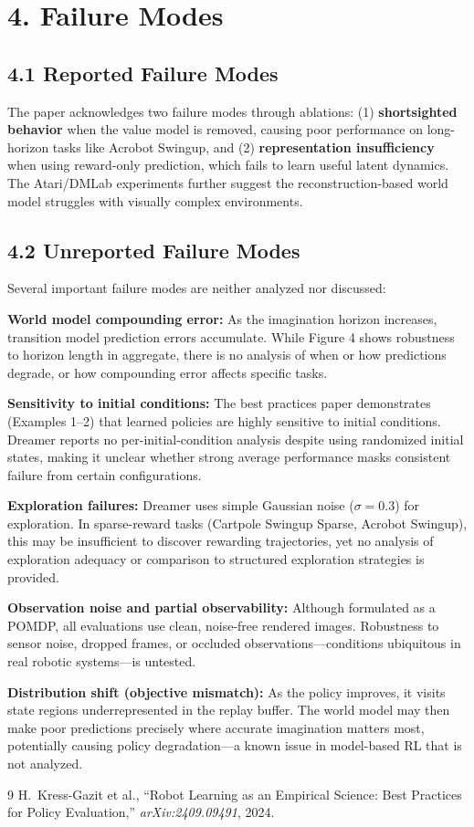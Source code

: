 \documentclass[11pt]{article}
\begin{document}
\section{4. Failure Modes}

\subsection{4.1 Reported Failure Modes}
The paper acknowledges two failure modes through ablations: (1)
\textbf{shortsighted behavior} when the value model is removed,
causing poor performance on long-horizon tasks like Acrobot Swingup,
and (2) \textbf{representation insufficiency} when using reward-only
prediction, which fails to learn useful latent dynamics. The
Atari/DMLab experiments further suggest the reconstruction-based
world model struggles with visually complex environments.

\subsection{4.2 Unreported Failure Modes}
Several important failure modes are neither analyzed nor discussed:

\textbf{World model compounding error:} As the imagination horizon
increases, transition model prediction errors accumulate. While
Figure 4 shows robustness to horizon length in aggregate, there is no
analysis of when or how predictions degrade, or how compounding error
affects specific tasks.

\textbf{Sensitivity to initial conditions:} The best practices paper
demonstrates (Examples 1--2) that learned policies are highly
sensitive to initial conditions. Dreamer reports no
per-initial-condition analysis despite using randomized initial
states, making it unclear whether strong average performance masks
consistent failure from certain configurations.

\textbf{Exploration failures:} Dreamer uses simple Gaussian noise
($\sigma = 0.3$) for exploration. In sparse-reward tasks (Cartpole
Swingup Sparse, Acrobot Swingup), this may be insufficient to
discover rewarding trajectories, yet no analysis of exploration
adequacy or comparison to structured exploration strategies is
provided.

\textbf{Observation noise and partial observability:} Although
formulated as a POMDP, all evaluations use clean, noise-free rendered
images. Robustness to sensor noise, dropped frames, or occluded
observations---conditions ubiquitous in real robotic
systems---is untested.

\textbf{Distribution shift (objective mismatch):} As the policy
improves, it visits state regions underrepresented in the replay
buffer. The world model may then make poor predictions precisely
where accurate imagination matters most, potentially causing policy
degradation---a known issue in model-based RL that is not analyzed.

\vspace{2pt}
\begin{thebibliography}{9}
  \small
   H.\ Kress-Gazit et al., ``Robot Learning as
  an Empirical Science: Best Practices for Policy Evaluation,''
  \textit{arXiv:2409.09491}, 2024.
\end{thebibliography}
\end{document}

